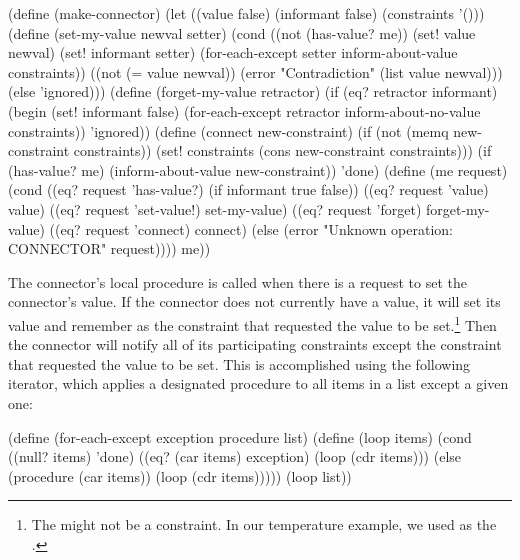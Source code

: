 \begin{codeBlock}
(define (make-connector)
  (let ((value false)
        (informant false)
        (constraints '()))
    (define (set-my-value newval setter)
      (cond ((not (has-value? me))
             (set! value newval)
             (set! informant setter)
             (for-each-except setter
                              inform-about-value
                              constraints))
            ((not (= value newval))
             (error
               "Contradiction"
               (list value newval)))
            (else 'ignored)))
    (define (forget-my-value retractor)
      (if (eq? retractor informant)
          (begin (set! informant false)
            (for-each-except retractor
                             inform-about-no-value
                             constraints))
          'ignored))
    (define (connect new-constraint)
      (if (not (memq new-constraint constraints))
          (set! constraints
                (cons new-constraint constraints)))
      (if (has-value? me)
          (inform-about-value new-constraint))
      'done)
    (define (me request)
      (cond ((eq? request 'has-value?)
             (if informant true false))
            ((eq? request 'value) value)
            ((eq? request 'set-value!) set-my-value)
            ((eq? request 'forget) forget-my-value)
            ((eq? request 'connect) connect)
            (else
              (error "Unknown operation: CONNECTOR"
                     request))))
    me))
\end{codeBlock}

\noindent
The connector's local procedure  is called when there is a
request to set the connector's value.  If the connector does not currently have
a value, it will set its value and remember as  the constraint
that requested the value to be set.\footnote{The  might not be a
constraint.  In our temperature example, we used  as the
.}  Then the connector will notify all of its participating
constraints except the constraint that requested the value to be set.  This is
accomplished using the following iterator, which applies a designated procedure
to all items in a list except a given one:

\begin{codeBlock}
(define (for-each-except exception
                         procedure
                         list)
  (define (loop items)
    (cond ((null? items) 'done)
          ((eq? (car items) exception)
           (loop (cdr items)))
          (else (procedure (car items))
                (loop (cdr items)))))
  (loop list))
\end{codeBlock}

